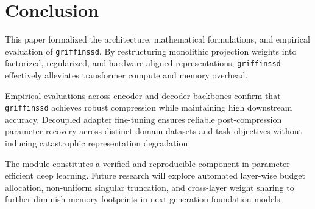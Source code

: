 \section{Conclusion}
This paper formalized the architecture, mathematical formulations, and empirical evaluation of \texttt{griffinssd}. By restructuring monolithic projection weights into factorized, regularized, and hardware-aligned representations, \texttt{griffinssd} effectively alleviates transformer compute and memory overhead.

Empirical evaluations across encoder and decoder backbones confirm that \texttt{griffinssd} achieves robust compression while maintaining high downstream accuracy. Decoupled adapter fine-tuning ensures reliable post-compression parameter recovery across distinct domain datasets and task objectives without inducing catastrophic representation degradation.

The module constitutes a verified and reproducible component in parameter-efficient deep learning. Future research will explore automated layer-wise budget allocation, non-uniform singular truncation, and cross-layer weight sharing to further diminish memory footprints in next-generation foundation models.
